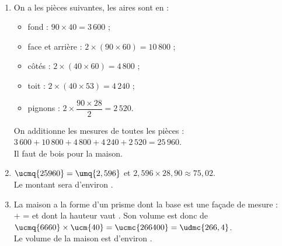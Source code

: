 \begin{colonne*exercice}
\begin{corrige}
   \ \\ [-5mm]
   \begin{enumerate}
      \item On a les pièces suivantes, les aires sont en \ucmq{} :
         \begin{itemize}
            \item fond : $90\times40 =3\,600$ ;
            \item face et arrière : $2\times(90\times60) =10\,800$ ;
            \item côtés : $2\times(40\times60) =4\,800$ ; 
            \item toit : $2\times(40\times53) =4\,240$ ; \smallskip
            \item pignons : $2\times\dfrac{90\times28}{2} =2\,520$. \smallskip
         \end{itemize}
         On additionne les mesures de toutes les pièces : \\
         $3\,600+10\,800+4\,800+4\,240+2\,520 =25\,960$. \\
         {\blue Il faut  de bois pour la maison}.
      \item $\ucmq{25960} =\umq{2,596}$ et $2,596\times28,90 \approx75,02$. \\
      {\blue Le montant sera d'environ }.
      \item La maison a la forme d'un prisme dont la base est une façade de mesure : \\
       +  =  et dont la hauteur vaut . Son volume est donc de $\ucmq{6660}\times\ucm{40} =\ucmc{266400} =\udmc{266,4}$. \\
      {\blue Le volume de la maison est d'environ }.
   \end{enumerate}
   
\bigskip
{}
\smallskip


\end{corrige}
\end{colonne*exercice}
